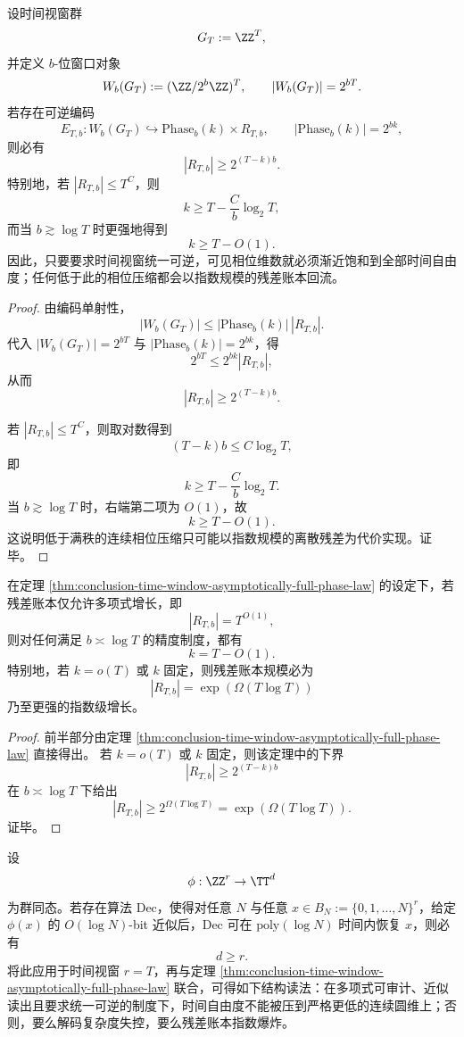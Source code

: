 \begin{theorem}[时间视窗的渐近满相位律]\label{thm:conclusion-time-window-asymptotically-full-phase-law}
设时间视窗群
\[
G_T:=\ZZ^T,
\]
并定义 \(b\)-位窗口对象
\[
W_b(G_T):=(\ZZ/2^b\ZZ)^T,
\qquad
|W_b(G_T)|=2^{bT}.
\]
若存在可逆编码
\[
E_{T,b}:W_b(G_T)\hookrightarrow \mathrm{Phase}_b(k)\times R_{T,b},
\qquad
|\mathrm{Phase}_b(k)|=2^{bk},
\]
则必有
\[
|R_{T,b}|\ge 2^{(T-k)b}.
\]
特别地，若 \(|R_{T,b}|\le T^C\)，则
\[
k\ge T-\frac{C}{b}\log_2 T,
\]
而当 \(b\gtrsim \log T\) 时更强地得到
\[
k\ge T-O(1).
\]
因此，只要要求时间视窗统一可逆，可见相位维数就必须渐近饱和到全部时间自由度；任何低于此的相位压缩都会以指数规模的残差账本回流。
\end{theorem}
\begin{proof}
由编码单射性，
\[
|W_b(G_T)|
\le
|\mathrm{Phase}_b(k)|\,|R_{T,b}|.
\]
代入
\(
|W_b(G_T)|=2^{bT}
\)
与
\(
|\mathrm{Phase}_b(k)|=2^{bk}
\)，得
\[
2^{bT}\le 2^{bk}|R_{T,b}|,
\]
从而
\[
|R_{T,b}|\ge 2^{(T-k)b}.
\]

若 \(|R_{T,b}|\le T^C\)，则取对数得到
\[
(T-k)b\le C\log_2 T,
\]
即
\[
k\ge T-\frac{C}{b}\log_2 T.
\]
当 \(b\gtrsim \log T\) 时，右端第二项为 \(O(1)\)，故
\[
k\ge T-O(1).
\]
这说明低于满秩的连续相位压缩只可能以指数规模的离散残差为代价实现。证毕。
\end{proof}

\begin{corollary}[多项式残差口径下的时间窗口相位饱和]\label{cor:conclusion-time-window-polynomial-ledger-phase-saturation}
在定理 \ref{thm:conclusion-time-window-asymptotically-full-phase-law} 的设定下，若残差账本仅允许多项式增长，即
\[
|R_{T,b}|=T^{O(1)},
\]
则对任何满足 \(b\asymp \log T\) 的精度制度，都有
\[
k=T-O(1).
\]
特别地，若 \(k=o(T)\) 或 \(k\) 固定，则残差账本规模必为
\[
|R_{T,b}|=\exp(\Omega(T\log T))
\]
乃至更强的指数级增长。
\end{corollary}
\begin{proof}
前半部分由定理 \ref{thm:conclusion-time-window-asymptotically-full-phase-law} 直接得出。
若 \(k=o(T)\) 或 \(k\) 固定，则该定理中的下界
\[
|R_{T,b}|\ge 2^{(T-k)b}
\]
在 \(b\asymp \log T\) 下给出
\[
|R_{T,b}|\ge 2^{\Omega(T\log T)}=\exp(\Omega(T\log T)).
\]
证毕。
\end{proof}

\begin{conjecture}[可审计可逆性强迫时间圆维不可压缩]\label{conj:conclusion-time-window-auditably-reversible-circle-dim-rigidity}
设
\[
\phi:\ZZ^r\to \TT^d
\]
为群同态。若存在算法 \(\mathrm{Dec}\)，使得对任意 \(N\) 与任意 \(x\in B_N:=\{0,1,\dots,N\}^r\)，给定 \(\phi(x)\) 的 \(O(\log N)\)-bit 近似后，\(\mathrm{Dec}\) 可在 \(\mathrm{poly}(\log N)\) 时间内恢复 \(x\)，则必有
\[
d\ge r.
\]
将此应用于时间视窗 \(r=T\)，再与定理 \ref{thm:conclusion-time-window-asymptotically-full-phase-law} 联合，可得如下结构读法：在多项式可审计、近似读出且要求统一可逆的制度下，时间自由度不能被压到严格更低的连续圆维上；否则，要么解码复杂度失控，要么残差账本指数爆炸。
\end{conjecture}

\endinput
